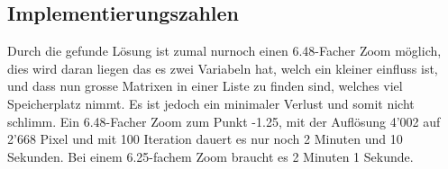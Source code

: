 \subsection{Implementierungszahlen}
Durch die gefunde Lösung ist zumal nurnoch einen 6.48-Facher Zoom möglich, dies wird daran liegen das es zwei Variabeln hat, welch ein kleiner einfluss ist, und dass nun grosse Matrixen in einer Liste zu finden sind, welches viel Speicherplatz nimmt. Es ist jedoch ein minimaler Verlust und somit nicht schlimm. Ein 6.48-Facher Zoom zum Punkt -1.25, mit der Auflösung 4'002 auf 2'668 Pixel und mit 100 Iteration dauert es nur noch 2 Minuten und 10 Sekunden. Bei einem 6.25-fachem Zoom braucht es 2 Minuten 1 Sekunde.
